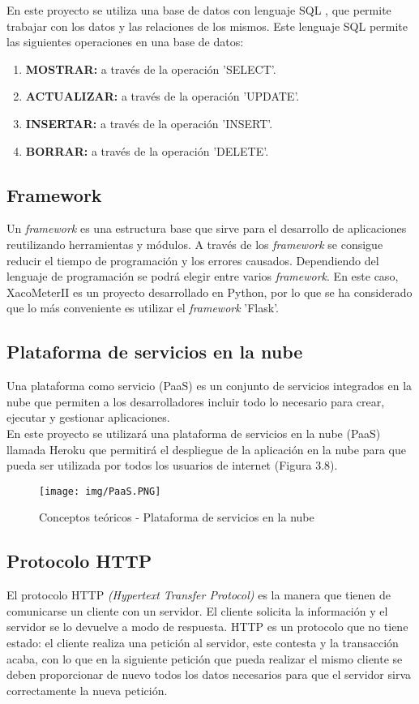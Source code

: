 En este proyecto se utiliza una base de datos con lenguaje SQL \cite{sql}, que permite trabajar con los datos y las relaciones de los mismos.
Este lenguaje SQL permite las siguientes operaciones en una base de datos:
\begin{enumerate}
    \item \textbf{MOSTRAR:} a través de la operación 'SELECT'.
    \item \textbf{ACTUALIZAR:} a través de la operación 'UPDATE'.
    \item \textbf{INSERTAR:}  a través de la operación 'INSERT'.
    \item \textbf{BORRAR:} a través de la operación 'DELETE'.
\end{enumerate}
\subsection{Framework}
Un \textit{framework} \cite{framework} es una estructura base que sirve para el desarrollo de aplicaciones reutilizando herramientas y módulos. 
A través de los \textit{framework} se consigue reducir el tiempo de programación y los errores causados.
Dependiendo del lenguaje de programación se podrá elegir entre varios \textit{framework}. En este caso, XacoMeterII es un proyecto desarrollado en Python, por lo que se ha considerado que lo más conveniente es utilizar el \textit{framework} 'Flask'.

\subsection{Plataforma de servicios en la nube}
Una plataforma como servicio (PaaS) \cite{PaaS} es un conjunto de servicios integrados en la nube que permiten a los desarrolladores incluir todo lo necesario  para crear, ejecutar y gestionar aplicaciones.\\
En este proyecto se utilizará una plataforma de servicios en la nube (PaaS) llamada Heroku que permitirá el despliegue de la aplicación en la nube para que pueda ser utilizada por todos los usuarios de internet (Figura 3.8).
\begin{figure}[h!]
    \centering
    \texttt{[image: img/PaaS.PNG]}
    \caption{Conceptos teóricos - Plataforma de servicios en la nube}
    \label{Conceptos teóricos - Plataforma de servicios en la nube}
\end{figure}

\subsection{Protocolo HTTP}
El protocolo HTTP \textit{(Hypertext Transfer Protocol)} \cite{HTTP} es la manera que tienen de comunicarse un cliente con un servidor. El cliente solicita la información y el servidor se lo devuelve a modo de respuesta.
HTTP es un protocolo que no tiene estado: el cliente realiza una petición al servidor, este contesta y la transacción acaba, con lo que en la siguiente petición que pueda realizar el mismo cliente se deben proporcionar de nuevo todos los datos necesarios para que el servidor sirva correctamente la nueva petición.
